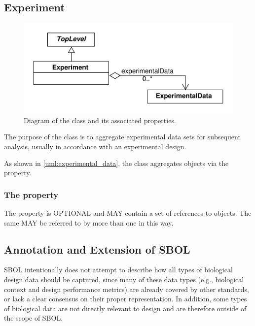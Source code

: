 \subsection{Experiment}
\label{sec:Experiment}


\begin{figure}[ht]
\begin{center}
\includegraphics[scale=0.6]{uml/experiment}
\caption[]{Diagram of the  class and its associated properties.}
\label{uml:experiment}
\end{center}
\end{figure}

The purpose of the  class is to aggregate experimental data sets for subsequent analysis, usually in accordance with an experimental design. 

As shown in \ref{uml:experimental_data}, the  class aggregates  objects via the  property.

\subsubsection*{ The  property}\label{sec:experimentalData}
The  property is OPTIONAL and MAY contain a set of  references to  objects. The same  MAY be referred to by more than one  in this way.

\subsection{Annotation and Extension of SBOL}
\label{sec:Annotations}

SBOL intentionally does not attempt to describe how all types of biological design data should be captured, since many of these data types (e.g., biological context and design performance metrics) are already covered by other standards, or lack a clear consensus on their proper representation. In addition, some types of biological data are not directly relevant to design and are therefore outside of the scope of SBOL.

